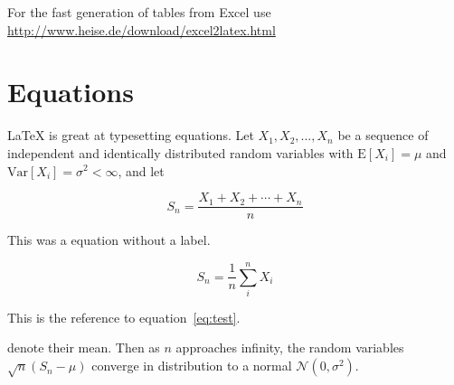For the fast generation of tables from Excel use \url{http://www.heise.de/download/excel2latex.html}

\section{Equations}

\LaTeX{} is great at typesetting equations. Let $X_1, X_2, \ldots, X_n$ be a sequence of independent and identically distributed random variables with $\text{E}[X_i] = \mu$ and $\text{Var}[X_i] = \sigma^2 < \infty$, and let

$$S_n = \frac{X_1 + X_2 + \cdots + X_n}{n}$$

This was a equation without a label.
      
\begin{equation}
S_n = \frac{1}{n}\sum_{i}^{n} X_i
\label{eq:test}
\end{equation}

This is the reference to equation~\ref{eq:test}.      

denote their mean. Then as $n$ approaches infinity, the random variables $\sqrt{n}(S_n - \mu)$ converge in distribution to a normal $\mathcal{N}(0, \sigma^2)$.


